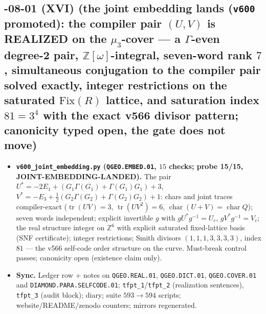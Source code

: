 \documentclass[11pt]{article}
\begin{document}
\subsection*{-08-01 (XVI) (the joint embedding lands (\texttt{v600} promoted): the compiler pair $(U,V)$ is REALIZED on the $\mu_3$-cover --- a $\Gamma$-even degree-2 pair, $\mathbb{Z}[\omega]$-integral, seven-word rank $7$, simultaneous conjugation to the compiler pair solved exactly, integer restrictions on the saturated $\mathrm{Fix}(R)$ lattice, and saturation index $81=3^4$ with the exact v566 divisor pattern; canonicity typed open, the gate does not move)}
\begin{itemize}[leftmargin=1.5em]
\item \textbf{\texttt{v600\_joint\_embedding.py} (\texttt{QGEO.EMBED.01}, $15$ checks; probe
15/15, JOINT-EMBEDDING-LANDED).} The pair $U^*=-2E_1+(G_1\Gamma(G_1)+\Gamma(G_1)G_1)+3$,
$V^*=-E_3+\tfrac12(G_2\Gamma(G_2)+\Gamma(G_2)G_2)+1$: chars and joint traces compiler-exact
($\operatorname{tr}(UV)=3$, $\operatorname{tr}(UV^2)=6$, $\operatorname{char}(U{+}V)=
\operatorname{char}Q$); seven words independent; explicit invertible $g$ with
$gU^*g^{-1}=U_c$, $gV^*g^{-1}=V_c$; the real structure integer on $\mathbb{Z}^6$ with
explicit saturated fixed-lattice basis (SNF certificate); integer restrictions; Smith
divisors $(1,1,1,3,3,3,3)$, index $81$ --- the v566 self-code order structure on the curve.
Must-break control passes; canonicity open (existence claim only).
\item \textbf{Sync.} Ledger row + notes on \texttt{QGEO.REAL.01},
\texttt{QGEO.DICT.01}, \texttt{QGEO.COVER.01} and
\texttt{DIAMOND.PARA.SELFCODE.01};
\texttt{tfpt\_1}/\texttt{tfpt\_2} (realization sentences), \texttt{tfpt\_3} (audit block);
diary; suite $593\to594$ scripts; website/README/zenodo counters; mirrors regenerated.
\end{itemize}
\end{document}
